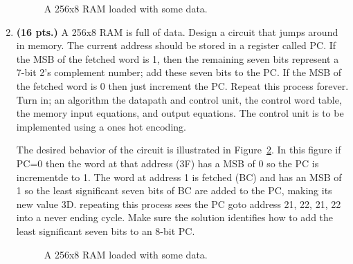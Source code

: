 \begin{enumerate}
\begin{figure}[ht]
\caption{A 256x8 RAM loaded with some data.}
\label{fig:RAMhopper}
\end{figure}

\item {\bf (16 pts.)}
A 256x8 RAM is full of data.  Design a circuit that jumps 
around in memory.   The current address should be stored in a
register called PC.  If the MSB of the fetched word is 1, then the 
remaining seven bits represent a 7-bit 2's complement number;  add these 
seven bits to the PC.  If the MSB of the fetched word is 0 then just 
increment the PC.  Repeat this process forever.
Turn in; an algorithm
the datapath and control unit,
the control word table,
the memory input equations, and
output equations.  
The control unit is to be implemented using a ones hot encoding.

The desired behavior of the circuit is illustrated in 
Figure~\ref{fig:RAMhopper2}.  In this figure if PC=0 then the word at
that address (3F) has a MSB of 0 so the PC is incrementde to 1. The
word at address 1 is fetched (BC) and has an MSB of 1 so the least
significant seven bits of BC are added to the PC, making its new value
3D.  repeating this process sees the PC goto address 21, 22, 21, 22
into a never ending cycle.   Make sure the solution identifies how
to add the least significant seven bits to an 8-bit PC.

\begin{figure}[ht]
\caption{A 256x8 RAM loaded with some data.}
\label{fig:RAMhopper2}
\end{figure}


\end{enumerate}
